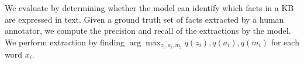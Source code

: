 \documentclass[12pt]{article}
\begin{document}
We evaluate by determining whether the model can identify which facts in a KB
are expressed in text.
Given a ground truth set of facts extracted by a human annotator,
we compute the precision and recall of the extractions by the model.
We perform extraction by finding $\arg\max_{z_i,a_i,m_i}q(z_i),q(a_i),q(m_i)$
for each word $x_i$.


\begin{comment}

\subsection{Approximate the posterior of a generative model}
Alternatively, we may introduce a generative model of text $q(x, v)$ 
that inverts the relation extraction model $p(v \mid x)$ and optimize the following objective:
\begin{equation}
\log q(x,v) - KL[p(v,z,a,m \mid x) || q(v,z,a,m \mid x)]
\end{equation}
which entails training the generative model of text while approximating its
posterior with the information extraction system.

decompose the training of our extraction system $p(v\mid x)$ into two stages:
In the first stage we train $p(z,a,m\mid x,d)$ to approximate the posterior
of a conditional model of text given a complete KB $q(x,z,a,m \mid v,d)$.
This has the benefit of allowing us to exert control over where value mentions are detected
through our design of the text model $q$.

In the second stage, we have two choices:
a) train $p(v \mid z,a,m,x,d)$ to approximate the posterior of a full generative model of text and
the values of KB $q(x,v\mid d)$.
b) train $p(v \mid z,a,m,x,d)$ using the following lower bound:
\begin{equation}
\label{eqn:lowerbound2}
\log p(v\mid x,d) \geq
\Es{p(z,a,m\mid x,d)}{\log p(v\mid z,a,m, x,d)}
\end{equation}
Ideally the bound in Eqn.~\ref{eqn:lowerbound2}
should not be looser than the one presented in Eqn.~\ref{eqn:lowerbound},
as conditioning on the observed values of a KB should not reduce the entropy of
a good alignment model.

How do we split the gradient over time?

\end{comment}



\end{document}
